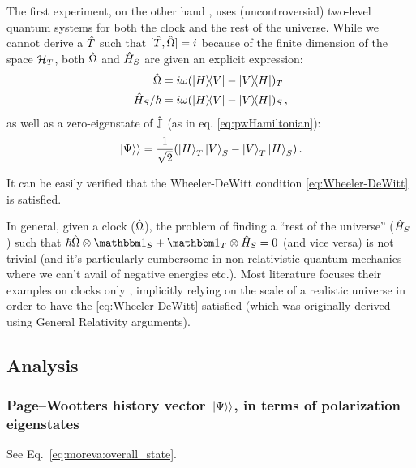 The first experiment, on the other hand \parencite{Moreva:illustration,Moreva:synthetic},
uses (uncontroversial)
two-level quantum systems for both the clock and the rest of the universe.
While we cannot derive a $\hat{T}$ such that $[\hat{T}, \hat{\Omega}] = i$
because of the finite dimension of the space $\mathcal{H}_T$, both $\hat{\Omega}$
and $\hat{H}_S$ are given an explicit expression:
\begin{align}
  \hat{\Omega}            &= i\omega(\ketbra{H}{V}- \ketbra{V}{H})_T \label{eq:MorevaOmegaT}\\
  \hat{H}_S/{\hbar}       &= i\omega(\ketbra{H}{V}- \ketbra{V}{H})_S \label{eq:MorevaH_S}
  \,\text{,}
\end{align}
as well as a zero-eigenstate of $\hat{\mathbb{J}}$ (as in eq. \ref{eq:pwHamiltonian}):
\begin{equation}\label{eq:moreva:overall_state}
  \left.\left| \Psi \right\rangle\right\rangle = \frac{1}{\sqrt{2}}\qty(\ket{H}_T\ket{V}_S-\ket{V}_T\ket{H}_S)
  \,\text{.}
\end{equation}

It can be easily verified that the Wheeler-DeWitt condition
\eqref{eq:Wheeler-DeWitt} is satisfied.

In general, given a clock ($\hat{\Omega}$), the problem of finding a
``rest of the universe'' ($\hat{H}_S$) such that
$\hbar\op{\Omega}\ox\idop_S + \idop_T\ox\op{H}_S = 0$
(and vice versa)
is not trivial
(and it's particularly cumbersome in non-relativistic
quantum mechanics where we can't avail of negative energies etc.).
Most literature focuses their examples on clocks only
\parencite{Prvanovic,RealisticClocks,HarmonicClocks},
implicitly relying on the scale of a realistic universe
in order to have the \eqref{eq:Wheeler-DeWitt} satisfied
(which was originally derived using General Relativity arguments).

\subsection{Analysis}

\subsubsection*{Page--Wootters history vector $\left.\left| \Psi \right\rangle\right\rangle$, in terms of polarization eigenstates}

See Eq.~\eqref{eq:moreva:overall_state}.

